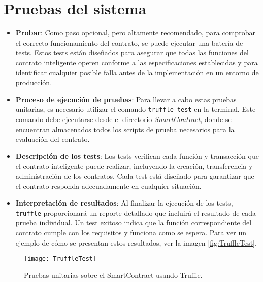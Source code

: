 \section{Pruebas del sistema}

\begin{itemize}

\item \textbf{Probar}: Como paso opcional, pero altamente recomendado, para comprobar el correcto funcionamiento del contrato, se puede ejecutar una batería de tests. Estos tests están diseñados para asegurar que todas las funciones del contrato inteligente operen conforme a las especificaciones establecidas y para identificar cualquier posible falla antes de la implementación en un entorno de producción.
	
\item \textbf{Proceso de ejecución de pruebas}: Para llevar a cabo estas pruebas unitarias, es necesario utilizar el comando \texttt{truffle test} en la terminal. Este comando debe ejecutarse desde el directorio \textit{SmartContract}, donde se encuentran almacenados todos los scripts de prueba necesarios para la evaluación del contrato.

\item \textbf{Descripción de los tests}: 
Los tests verifican cada función y transacción que el
contrato inteligente puede realizar, incluyendo la creación,
transferencia y administración de los contratos.
Cada test está diseñado para garantizar que el contrato responda adecuadamente en cualquier situación.

\item \textbf{Interpretación de resultados}: Al finalizar la ejecución de los tests, \texttt{truffle} proporcionará un reporte detallado que incluirá el resultado de cada prueba individual.
Un test exitoso indica que la función correspondiente del contrato cumple con los requisitos y funciona como se espera. 
Para ver un ejemplo de cómo se presentan estos resultados, ver la imagen \ref{fig:TruffleTest}.

\end{itemize}

\begin{figure}[h]
	\label{img:TruffleTest}
	\centering
	\texttt{[image: TruffleTest]}
	\caption[Pruebas sobre el contrato]{Pruebas unitarias sobre el SmartContract usando Truffle.}
\end{figure}	

